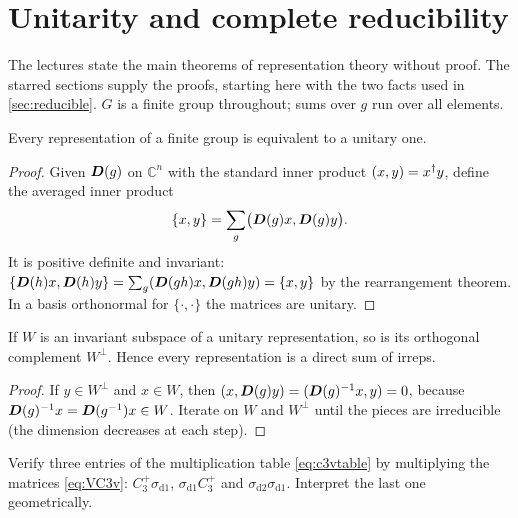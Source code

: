 \section{Unitarity and complete reducibility\beyondmark}\label{sec:unitarity}

The lectures state the main theorems of representation theory without proof. The
starred sections supply the proofs, starting here with the two facts used in
\cref{sec:reducible}. $G$ is a finite group throughout; sums over $g$ run over all
elements.

\begin{theorem}
Every representation of a finite group is equivalent to a unitary one.
\end{theorem}
\begin{proof}
Given $\bm{D}(g)$ on $\mathbb{C}^n$ with the standard inner product $(x,y)=x^{\dagger} y$,
define the averaged inner product
\[\{x,y\}=\sum_g\bigl(\bm{D}(g)x,\bm{D}(g)y\bigr).\] It is positive
definite and invariant: $\{\bm{D}(h)x,\bm{D}(h)y\}=\sum_g(\bm{D}(gh)x,\bm{D}(gh)y)=\{x,y\}$
by the rearrangement theorem. In a basis orthonormal for $\{\cdot,\cdot\}$ the matrices
are unitary.
\end{proof}

\begin{theorem}[Maschke]
If $W$ is an invariant subspace of a unitary representation, so is its orthogonal
complement $W^\perp$. Hence every representation is a direct sum of irreps.
\end{theorem}
\begin{proof}
If $y\in W^\perp$ and $x\in W$, then $(x,\bm{D}(g)y)=(\bm{D}(g)^{-1}x,y)=0$, because
$\bm{D}(g)^{-1}x=\bm{D}(g^{-1})x\in W$. Iterate on $W$ and $W^\perp$ until the pieces are
irreducible (the dimension decreases at each step).
\end{proof}

\exercisesection

\begin{exercise}\label{ex:1:table}
Verify three entries of the multiplication table \eqref{eq:c3vtable} by multiplying
the matrices \eqref{eq:VC3v}: $C_3^+\sigma_{\mathrm{d}1}$,
$\sigma_{\mathrm{d}1}C_3^+$ and $\sigma_{\mathrm{d}2}\sigma_{\mathrm{d}1}$. Interpret
the last one geometrically.
\end{exercise}

